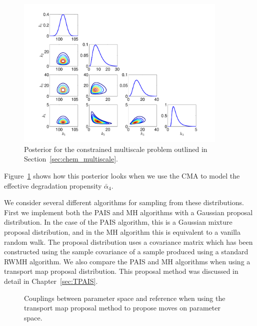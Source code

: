 \documentclass[final]{siamltex}
\newcommand\irregularcircle[2]{%
  \pgfextra {\pgfmathsetmacro\len{(#1)+rand*(#2)}}
  +(0:\len pt)
  \foreach \a in {10,20,...,350}{
    \pgfextra {\pgfmathsetmacro\len{(#1)+rand*(#2)}}
    -- +(\a:\len pt)
  } -- cycle
}
\begin{document}
\begin{figure}[htb]
\centering
\includegraphics[width=0.9\textwidth]{"images/Applications/CMA_posterior"}
\caption{Posterior for the constrained multiscale problem outlined in Section~\ref{sec:chem_multiscale}.}
\label{fig:chem_CMA_posterior}
\end{figure}

Figure~\ref{fig:chem_CMA_posterior} shows how this posterior looks
when we use the CMA to model the effective degradation propensity $\bar{\alpha}_4$.

We consider several different algorithms for sampling from these
distributions. First we implement both the PAIS and MH algorithms with
a Gaussian proposal distribution. In the case of the PAIS algorithm,
this is a Gaussian mixture proposal distribution, and in the MH
algorithm this is equivalent to a vanilla random walk. The proposal distribution uses a covariance matrix which has been constructed using the sample covariance of a sample produced using a standard RWMH algorithm. We also compare the PAIS and MH algorithms when using a transport map proposal distribution. This proposal method was discussed in detail in Chapter~\ref{sec:TPAIS}.

\begin{figure}
	\centering
	\caption{Couplings between parameter space and reference when using the transport map proposal method to propose moves on parameter space.}
	\label{fig:chem_coupling}
\end{figure}
\end{document}
